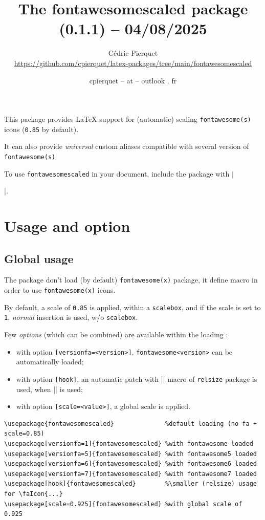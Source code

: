 \documentclass{article}
\begin{document}
\title{The \textsf{fontawesomescaled} package (0.1.1) -- 04/08/2025}
\author{%
	Cédric Pierquet\\%
	\url{https://github.com/cpierquet/latex-packages/tree/main/fontawesomescaled}%
}
\date{cpierquet -- at -- outlook . fr}\maketitle

This package provides \LaTeX{} support for (automatic) scaling \texttt{fontawesome(s)} icons (\texttt{0.85} by default).

It can also provide \textit{universal} custom aliases compatible with several version of \texttt{fontawesome(s)}

\medskip

To use \texttt{fontawesomescaled} in your document, include the package with |\usepackage{fontawesomescaled}|.

\section{Usage and option}

\subsection{Global usage}

The package don't load (by default)  \texttt{fontawesome(x)} package, it define macro in order to use \texttt{fontawesome(x)} icons.

By default, a scale of \texttt{0.85} is applied, within a \texttt{scalebox}, and if the scale is set to \texttt{1}, \textit{normal} insertion is used, w/o \texttt{scalebox}.

Few \textit{options} (which can be combined) are available within the loading :

\begin{itemize}
	\item with option \texttt{[versionfa=<version>]}, \texttt{fontawesome<version>} can be automatically loaded;
	\item with option \texttt{[hook]}, an automatic patch with |\smaller| macro of \texttt{relsize} package is used, when |\faIcon| is used;
	\item with option \texttt{[scale=<value>]}, a global scale is applied.
\end{itemize}

\begin{Verbatim}[frame=single]
\usepackage{fontawesomescaled}              %default loading (no fa + scale=0.85)
\usepackage[versionfa=1]{fontawesomescaled} %with fontawesome loaded
\usepackage[versionfa=5]{fontawesomescaled} %with fontawesome5 loaded
\usepackage[versionfa=6]{fontawesomescaled} %with fontawesome6 loaded
\usepackage[versionfa=7]{fontawesomescaled} %with fontawesome7 loaded
\usepackage[hook]{fontawesomescaled}        %\smaller (relsize) usage for \faIcon{...}
\usepackage[scale=0.925]{fontawesomescaled} %with global scale of 0.925
\end{Verbatim}
\end{document}
